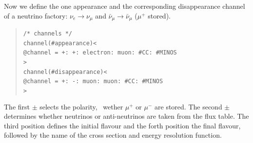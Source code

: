 Now we define the one appearance and the corresponding disappearance 
channel of a neutrino factory: 
$\nu_e\rightarrow\nu_\mu$  and $\bar\nu_\mu\rightarrow\bar\nu_\mu$ 
($\mu^+$ stored).
\begin{quote}
{\tt /* channels */}\\
{\tt channel(\#appearance)<}\\
{\tt \hspace*{3ex}@channel = +: +: electron: muon: \#CC: \#MINOS}\\
{\tt >}\\
{\tt channel(\#disappearance)<}\\
{\tt \hspace*{3ex}@channel = +: -: muon: muon: \#CC: \#MINOS}\\
{\tt >}
\end{quote}
The first $\pm$ selects the polarity, \ie\ wether $\mu^+$ or $\mu^-$ are 
stored. The second $\pm$ determines whether neutrinos or anti-neutrinos are
taken from the flux table. The third position defines the initial flavour
and the forth position the final flavour, followed by the name of the cross
section and energy resolution function.

